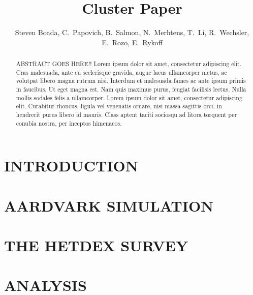 \documentclass[apj, revtex4]{emulateapj}
\begin{document}
\title{Cluster Paper}

\author{\sc Steven Boada, 
C.~Papovich,
B.~Salmon, 
N.~Merhtens,
T.~Li, 
R.~Wechsler,
E.~Rozo,
E.~Rykoff} 


\begin{abstract}
\noindent
ABSTRACT GOES HERE!!
Lorem ipsum dolor sit amet, consectetur adipiscing elit. Cras malesuada, ante eu scelerisque gravida, augue lacus ullamcorper metus, ac volutpat libero magna rutrum nisi. Interdum et malesuada fames ac ante ipsum primis in faucibus. Ut eget magna est. Nam quis maximus purus, feugiat facilisis lectus. Nulla mollis sodales felis a ullamcorper. Lorem ipsum dolor sit amet, consectetur adipiscing elit. Curabitur rhoncus, ligula vel venenatis ornare, nisi massa sagittis orci, in hendrerit purus libero id mauris. Class aptent taciti sociosqu ad litora torquent per conubia nostra, per inceptos himenaeos.
\end{abstract}

\section{INTRODUCTION}

\section{AARDVARK SIMULATION}

\section{THE HETDEX SURVEY}

\section{ANALYSIS}
\end{document}
